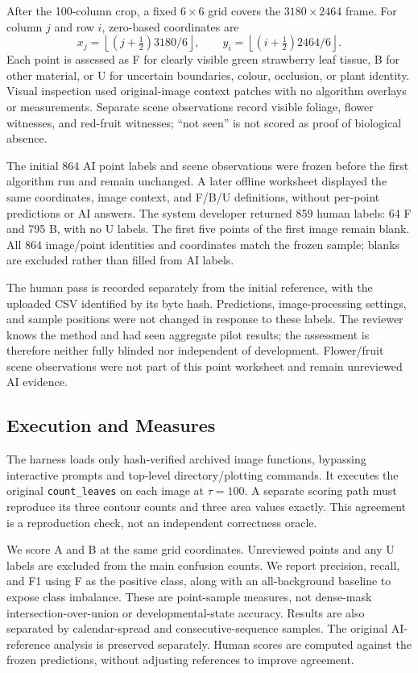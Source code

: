 \documentclass[runningheads]{llncs}
\newcommand{\code}[1]{\texttt{#1}}
\begin{document}
After the 100-column crop, a fixed $6\times6$ grid covers the $3180\times2464$ frame. For column $j$ and row $i$, zero-based coordinates are
\begin{equation}
 x_j=\left\lfloor(j+\tfrac12)3180/6\right\rfloor,\qquad
 y_i=\left\lfloor(i+\tfrac12)2464/6\right\rfloor.
\end{equation}
Each point is assessed as F for clearly visible green strawberry leaf tissue, B for other material, or U for uncertain boundaries, colour, occlusion, or plant identity. Visual inspection used original-image context patches with no algorithm overlays or measurements. Separate scene observations record visible foliage, flower witnesses, and red-fruit witnesses; ``not seen'' is not scored as proof of biological absence.

The initial 864 AI point labels and scene observations were frozen before the first algorithm run and remain unchanged. A later offline worksheet displayed the same coordinates, image context, and F/B/U definitions, without per-point predictions or AI answers. The system developer returned 859 human labels: 64 F and 795 B, with no U labels. The first five points of the first image remain blank. All 864 image/point identities and coordinates match the frozen sample; blanks are excluded rather than filled from AI labels.

The human pass is recorded separately from the initial reference, with the uploaded CSV identified by its byte hash. Predictions, image-processing settings, and sample positions were not changed in response to these labels. The reviewer knows the method and had seen aggregate pilot results; the assessment is therefore neither fully blinded nor independent of development. Flower/fruit scene observations were not part of this point worksheet and remain unreviewed AI evidence.

\subsection{Execution and Measures}
The harness loads only hash-verified archived image functions, bypassing interactive prompts and top-level directory/plotting commands. It executes the original \code{count\_leaves} on each image at $\tau=100$. A separate scoring path must reproduce its three contour counts and three area values exactly. This agreement is a reproduction check, not an independent correctness oracle.

We score A and B at the same grid coordinates. Unreviewed points and any U labels are excluded from the main confusion counts. We report precision, recall, and F1 using F as the positive class, along with an all-background baseline to expose class imbalance. These are point-sample measures, not dense-mask intersection-over-union or developmental-state accuracy. Results are also separated by calendar-spread and consecutive-sequence samples. The original AI-reference analysis is preserved separately. Human scores are computed against the frozen predictions, without adjusting references to improve agreement.
\end{document}
